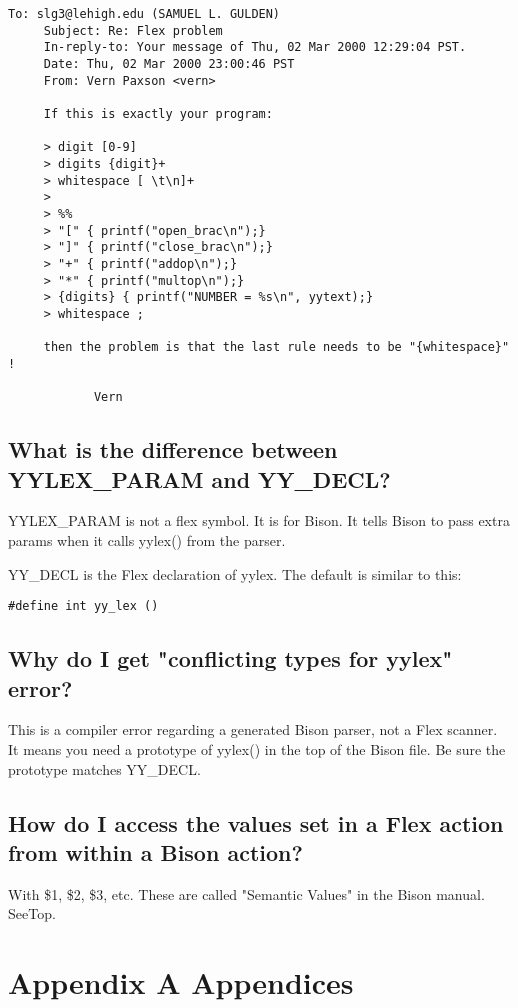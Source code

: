 \documentclass[openany,oneside]{book}
\begin{document}
\begin{verbatim}
To: slg3@lehigh.edu (SAMUEL L. GULDEN)
     Subject: Re: Flex problem
     In-reply-to: Your message of Thu, 02 Mar 2000 12:29:04 PST.
     Date: Thu, 02 Mar 2000 23:00:46 PST
     From: Vern Paxson <vern>
     
     If this is exactly your program:
     
     > digit [0-9]
     > digits {digit}+
     > whitespace [ \t\n]+
     >
     > %%
     > "[" { printf("open_brac\n");}
     > "]" { printf("close_brac\n");}
     > "+" { printf("addop\n");}
     > "*" { printf("multop\n");}
     > {digits} { printf("NUMBER = %s\n", yytext);}
     > whitespace ;
     
     then the problem is that the last rule needs to be "{whitespace}" !
     
     		Vern
\end{verbatim}

\section{What is the difference between YYLEX\_{}PARAM and YY\_{}DECL?}


YYLEX\_{}PARAM is not a flex symbol. It is for Bison. It tells Bison to pass extra
params when it calls yylex() from the parser.

YY\_{}DECL is the Flex declaration of yylex. The default is similar to this:
\begin{verbatim}
#define int yy_lex ()
\end{verbatim}

\section{Why do I get "conflicting types for yylex" error?}


This is a compiler error regarding a generated Bison parser, not a Flex scanner. 
It means you need a prototype of yylex() in the top of the Bison file. 
Be sure the prototype matches YY\_{}DECL.
\section{How do I access the values set in a Flex action from within a Bison action?}


With \${}1, \${}2, \${}3, etc. These are called "Semantic Values" in the Bison manual. 
SeeTop.
\chapter{Appendix A Appendices}
\end{document}
